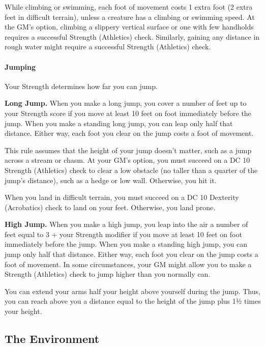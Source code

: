 \documentclass[
]{article}
\begin{document}
While climbing or swimming, each foot of movement costs 1 extra foot (2
extra feet in difficult terrain), unless a creature has a climbing or
swimming speed. At the GM's option, climbing a slippery vertical surface
or one with few handholds requires a successful Strength (Athletics)
check. Similarly, gaining any distance in rough water might require a
successful Strength (Athletics) check.

\hypertarget{jumping}{%
\paragraph{Jumping}\label{jumping}}

Your Strength determines how far you can jump.

\textbf{Long Jump.} When you make a long jump, you cover a number of
feet up to your Strength score if you move at least 10 feet on foot
immediately before the jump. When you make a standing long jump, you can
leap only half that distance. Either way, each foot you clear on the
jump costs a foot of movement.

This rule assumes that the height of your jump doesn't matter, such as a
jump across a stream or chasm. At your GM's option, you must succeed on
a DC 10 Strength (Athletics) check to clear a low obstacle (no taller
than a quarter of the jump's distance), such as a hedge or low wall.
Otherwise, you hit it.

When you land in difficult terrain, you must succeed on a DC 10
Dexterity (Acrobatics) check to land on your feet. Otherwise, you land
prone.

\textbf{High Jump.} When you make a high jump, you leap into the air a
number of feet equal to 3 + your Strength modifier if you move at least
10 feet on foot immediately before the jump. When you make a standing
high jump, you can jump only half that distance. Either way, each foot
you clear on the jump costs a foot of movement. In some circumstances,
your GM might allow you to make a Strength (Athletics) check to jump
higher than you normally can.

You can extend your arms half your height above yourself during the
jump. Thus, you can reach above you a distance equal to the height of
the jump plus 1½ times your height.

\hypertarget{the-environment}{%
\subsection{The Environment}\label{the-environment}}
\end{document}
